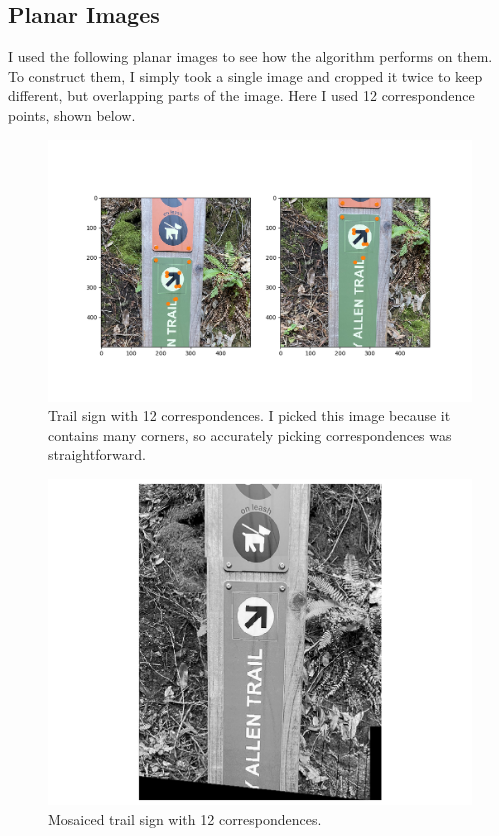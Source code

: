 \documentclass[]{article}
\begin{document}
\newpage

	\subsection{Planar Images}
		I used the following planar images to see how the algorithm performs on them. To construct them, I simply took a single image and cropped it twice to keep different, but overlapping parts of the image. Here I used 12 correspondence points, shown below.		
		
		\begin{figure}[H]
			\centering
			\includegraphics[width=6.5in]{test_images/sign_12_correspondences.png}
			\caption{Trail sign with 12 correspondences. I picked this image because it contains many corners, so accurately picking correspondences was straightforward.}
		\end{figure}
	
		\begin{figure}[H]
			\centering
			\includegraphics[width=6.5in]{test_images/sign_12_floor.png}
			\caption{Mosaiced trail sign with 12 correspondences. }
		\end{figure}
\end{document}
